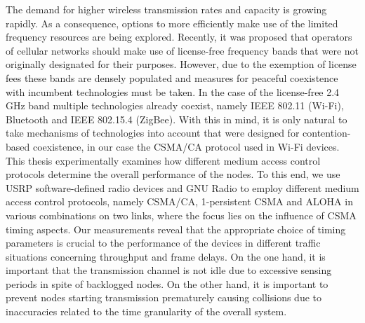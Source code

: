 The demand for higher wireless transmission rates and capacity is growing rapidly. As a consequence, options to more efficiently make use of the limited frequency resources are being explored. Recently, it was proposed that operators of cellular networks should make use of license-free frequency bands that were not originally designated for their purposes. However, due to the exemption of license fees these bands are densely populated and measures for peaceful coexistence with incumbent technologies must be taken. In the case of the license-free 2.4 GHz band multiple technologies already coexist, namely IEEE 802.11 (Wi-Fi), Bluetooth and IEEE 802.15.4 (ZigBee). With this in mind, it is only natural to take mechanisms of technologies into account that were designed for contention-based coexistence, in our case the CSMA/CA protocol used in Wi-Fi devices. 
This thesis experimentally examines how different medium access control protocols determine the overall performance of the nodes. To this end, we use USRP software-defined radio devices and GNU Radio to employ different medium access control protocols, namely CSMA/CA, 1-persistent CSMA and ALOHA in various combinations on two links, where the focus lies on the influence of CSMA timing aspects. 
Our measurements reveal that the appropriate choice of timing parameters is crucial to the performance of the devices in different traffic situations concerning throughput and frame delays. On the one hand, it is important that the transmission channel is not idle due to excessive sensing periods in spite of backlogged nodes. On the other hand, it is important to prevent nodes starting transmission prematurely causing collisions due to inaccuracies related to the time granularity of the overall system.  